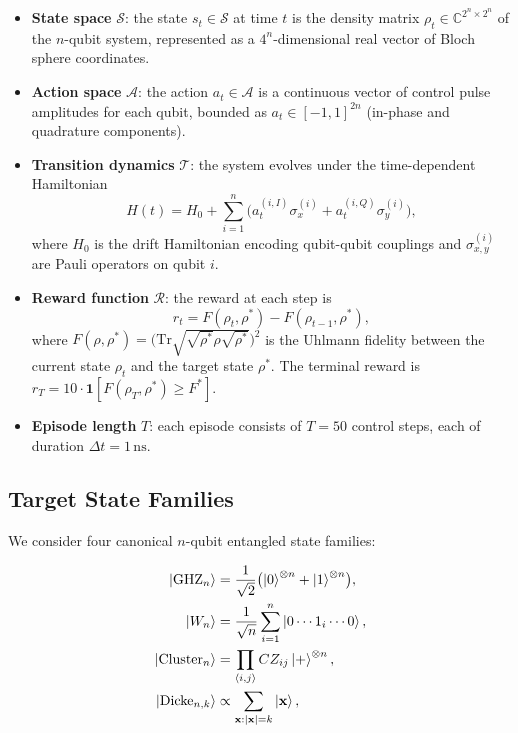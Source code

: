 \documentclass[twocolumn,superscriptaddress]{quantumarticle}
\begin{document}
\begin{itemize}
  \item \textbf{State space} $\mathcal{S}$: the state $s_t \in \mathcal{S}$ at
    time $t$ is the density matrix $\rho_t \in \mathbb{C}^{2^n \times 2^n}$ of
    the $n$-qubit system, represented as a $4^n$-dimensional real vector of
    Bloch sphere coordinates.
  \item \textbf{Action space} $\mathcal{A}$: the action $a_t \in \mathcal{A}$
    is a continuous vector of control pulse amplitudes for each qubit, bounded
    as $a_t \in [-1, 1]^{2n}$ (in-phase and quadrature components).
  \item \textbf{Transition dynamics} $\mathcal{T}$: the system evolves under
    the time-dependent Hamiltonian
    \begin{equation}
      H(t) = H_0 + \sum_{i=1}^{n} \bigl(a_t^{(i,I)} \sigma_x^{(i)}
             + a_t^{(i,Q)} \sigma_y^{(i)}\bigr),
    \end{equation}
    where $H_0$ is the drift Hamiltonian encoding qubit-qubit couplings and
    $\sigma_{x,y}^{(i)}$ are Pauli operators on qubit $i$.
  \item \textbf{Reward function} $\mathcal{R}$: the reward at each step is
    \begin{equation}
      r_t = F(\rho_t, \rho^*) - F(\rho_{t-1}, \rho^*),
    \end{equation}
    where $F(\rho, \rho^*) = \bigl(\mathrm{Tr}\sqrt{\sqrt{\rho^*}\rho\sqrt{\rho^*}}\bigr)^2$
    is the Uhlmann fidelity between the current state $\rho_t$ and the target
    state $\rho^*$. The terminal reward is $r_T = 10 \cdot \mathbf{1}[F(\rho_T, \rho^*) \geq F^*]$.
  \item \textbf{Episode length} $T$: each episode consists of $T = 50$ control
    steps, each of duration $\Delta t = 1\,\mathrm{ns}$.
\end{itemize}

\subsection{Target State Families}

We consider four canonical $n$-qubit entangled state families:

\begin{align}
  \ket{\mathrm{GHZ}_n} &= \frac{1}{\sqrt{2}}\bigl(\ket{0}^{\otimes n} + \ket{1}^{\otimes n}\bigr), \\
  \ket{W_n} &= \frac{1}{\sqrt{n}}\sum_{i=1}^{n} \ket{0\cdots 1_i \cdots 0}, \\
  \ket{\mathrm{Cluster}_n} &= \prod_{\langle i,j\rangle} CZ_{ij} \ket{+}^{\otimes n}, \\
  \ket{\mathrm{Dicke}_{n,k}} &\propto \sum_{\mathbf{x}: |\mathbf{x}|=k} \ket{\mathbf{x}},
\end{align}
\end{document}
